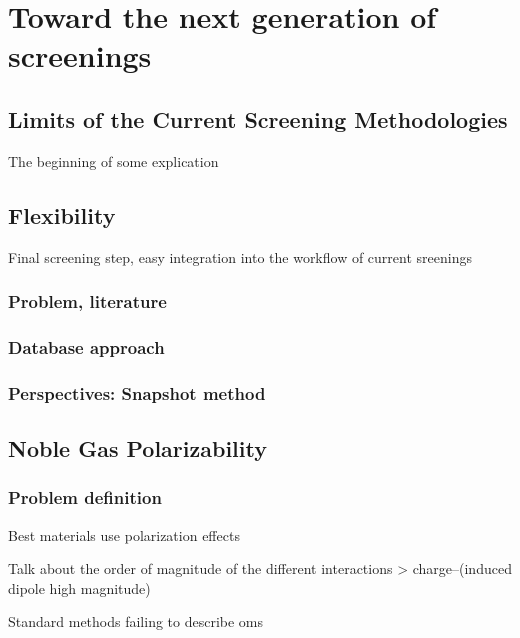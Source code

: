 \documentclass[main]{subfiles}
\begin{document}
\chapter{Toward the next generation of screenings}
\vspace*{-1\baselineskip}

\section{Limits of the Current Screening Methodologies}


The beginning of some explication

\section{Flexibility}
Final screening step, easy integration into the workflow of current sreenings
\subsection{Problem, literature}

\subsection{Database approach}

\subsection{Perspectives: Snapshot method}

\section{Noble Gas Polarizability}

\subsection{Problem definition}

Best materials use polarization effects \autocite{Li_2019,Pei_2022}

Talk about the order of magnitude of the different interactions > charge--(induced dipole high magnitude)

Standard methods failing to describe oms\autocite{Perry_2014} 

\end{document}
